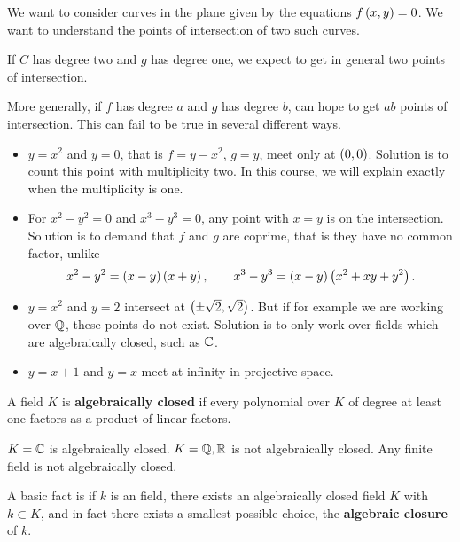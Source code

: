 We want to consider curves in the plane given by the equations $ f\left( x, y \right) = 0 $. We want to understand the points of intersection of two such curves.

\begin{example*}
If $ C $ has degree two and $ g $ has degree one, we expect to get in general two points of intersection.
\end{example*}

More generally, if $ f $ has degree $ a $ and $ g $ has degree $ b $, can hope to get $ ab $ points of intersection. This can fail to be true in several different ways.
\begin{itemize}
\item $ y = x^2 $ and $ y = 0 $, that is $ f = y - x^2 $, $ g = y $, meet only at $ \left( 0, 0 \right) $. Solution is to count this point with multiplicity two. In this course, we will explain exactly when the multiplicity is one.
\item For $ x^2 - y^2 = 0 $ and $ x^3 - y^3 = 0 $, any point with $ x = y $ is on the intersection. Solution is to demand that $ f $ and $ g $ are coprime, that is they have no common factor, unlike
$$ x^2 - y^2 = \left( x - y \right)\left( x + y \right), \qquad x^3 - y^3 = \left( x - y \right)\left( x^2 + xy + y^2 \right). $$
\item $ y = x^2 $ and $ y = 2 $ intersect at $ \left( \pm \sqrt{2}, \sqrt{2} \right) $. But if for example we are working over $ \mathbb{Q} $, these points do not exist. Solution is to only work over fields which are algebraically closed, such as $ \mathbb{C} $.
\item $ y = x + 1 $ and $ y = x $ meet at infinity in projective space.
\end{itemize}

\begin{definition}
A field $ K $ is \textbf{algebraically closed} if every polynomial over $ K $ of degree at least one factors as a product of linear factors.
\end{definition}

\begin{example*}
$ K = \mathbb{C} $ is algebraically closed. $ K = \mathbb{Q}, \mathbb{R} $ is not algebraically closed. Any finite field is not algebraically closed.
\end{example*}

A basic fact is if $ k $ is an field, there exists an algebraically closed field $ K $ with $ k \subset K $, and in fact there exists a smallest possible choice, the \textbf{algebraic closure} of $ k $.


